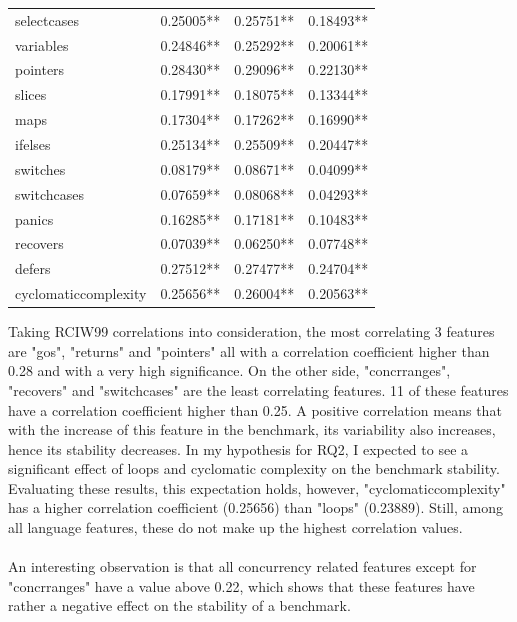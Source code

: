 \documentclass{seal_thesis}
\begin{document}
\begin{table}[H]
\begin{tabular}{@{}llll@{}}
		selectcases & \cellcolor[HTML]{C0C0C0}0.25005** & \cellcolor[HTML]{FFCC99}0.25751** & \cellcolor[HTML]{99CCFF}0.18493** \\
		variables & \cellcolor[HTML]{C0C0C0}0.24846** & \cellcolor[HTML]{C0C0C0}0.25292** & \cellcolor[HTML]{99CCFF}0.20061** \\
		pointers & \cellcolor[HTML]{FFCC99}0.28430** & \cellcolor[HTML]{FFCC99}0.29096** & \cellcolor[HTML]{C0C0C0}0.22130** \\
		slices & \cellcolor[HTML]{99CCFF}0.17991** & \cellcolor[HTML]{99CCFF}0.18075** & \cellcolor[HTML]{99CCFF}0.13344** \\
		maps & \cellcolor[HTML]{99CCFF}0.17304** & \cellcolor[HTML]{99CCFF}0.17262** & \cellcolor[HTML]{99CCFF}0.16990** \\
		ifelses & \cellcolor[HTML]{C0C0C0}0.25134** & \cellcolor[HTML]{FFCC99}0.25509** & \cellcolor[HTML]{99CCFF}0.20447** \\
		switches & \cellcolor[HTML]{99CCFF}0.08179** & \cellcolor[HTML]{99CCFF}0.08671** & \cellcolor[HTML]{3366FF}0.04099** \\
		switchcases & \cellcolor[HTML]{99CCFF}0.07659** & \cellcolor[HTML]{99CCFF}0.08068** & \cellcolor[HTML]{3366FF}0.04293** \\
		panics & \cellcolor[HTML]{99CCFF}0.16285** & \cellcolor[HTML]{99CCFF}0.17181** & \cellcolor[HTML]{99CCFF}0.10483** \\
		recovers & \cellcolor[HTML]{3366FF}0.07039** & \cellcolor[HTML]{3366FF}0.06250** & \cellcolor[HTML]{99CCFF}0.07748** \\
		defers & \cellcolor[HTML]{FFCC99}0.27512** & \cellcolor[HTML]{FFCC99}0.27477** & \cellcolor[HTML]{C0C0C0}0.24704** \\
		cyclomaticcomplexity & \cellcolor[HTML]{FFCC99}0.25656** & \cellcolor[HTML]{FFCC99}0.26004** & \cellcolor[HTML]{99CCFF}0.20563** \\
		\bottomrule
	\end{tabular}
\end{table}

\noindent Taking RCIW99 correlations into consideration, the most correlating 3 features are "gos", "returns" and "pointers" all with a correlation coefficient higher than 0.28 and with a very high significance. On the other side, "concrranges", "recovers" and "switchcases" are the least correlating features. 11 of these features have a correlation coefficient higher than 0.25. A positive correlation means that with the increase of this feature in the benchmark, its variability also increases, hence its stability decreases. In my hypothesis for RQ2, I expected to see a significant effect of loops and cyclomatic complexity on the benchmark stability. Evaluating these results, this expectation holds, however, "cyclomaticcomplexity" has a higher correlation coefficient (0.25656) than "loops" (0.23889). Still, among all language features, these do not make up the highest correlation values.\\
\\
An interesting observation is that all concurrency related features except for "concrranges" have a value above 0.22, which shows that these features have rather a negative effect on the stability of a benchmark.
\end{document}
